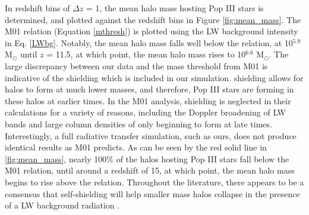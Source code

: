 \documentclass[a4paper,fleqn,usenatbib]{mnras}
\begin{document}
In redshift bins of $\Delta z$ = 1, the mean halo mass hosting Pop III stars is determined, and plotted against the redshift bins in Figure \ref{fig:mean_mass}. The M01 relation (Equation \ref{mthresh}) is plotted using the LW background intensity in Eq. \ref{LWbg}. Notably, the mean halo mass falls well below the relation, at 10$^{5.9}$ M$_{\odot}$ until $z$ = 11.5, at which point, the mean halo mass rises to 10$^{6.6}$ M$_{\odot}$. The large discrepancy between our data and the mass threshold from M01 is indicative of the \hh{} shielding which is included in our simulation. \hh{} shielding allows for halos to form at much lower masses, and therefore, Pop III stars are forming in these halos at earlier times. In the M01 analysis, \hh{} shielding is neglected in their calculations for a variety of reasons, including the Doppler broadening of LW bands and large column densities of \hh{} only beginning to form at late times. Interestingly, a full radiative transfer simulation, such as ours, does not produce identical results as M01 predicts. As can be seen by the red solid line in \ref{fig:mean_mass}, nearly 100\% of the halos hosting Pop III stars fall below the M01 relation, until around a redshift of 15, at which point, the mean halo mass begins to rise above the relation. Throughout the literature, there appears to be a consensus that \hh{} self-shielding will help smaller mass halos collapse in the presence of a LW background radiation \citep[E.g.][]{Yoshida03, Ricotti01, Glover01, Hartwig15}.
\end{document}
